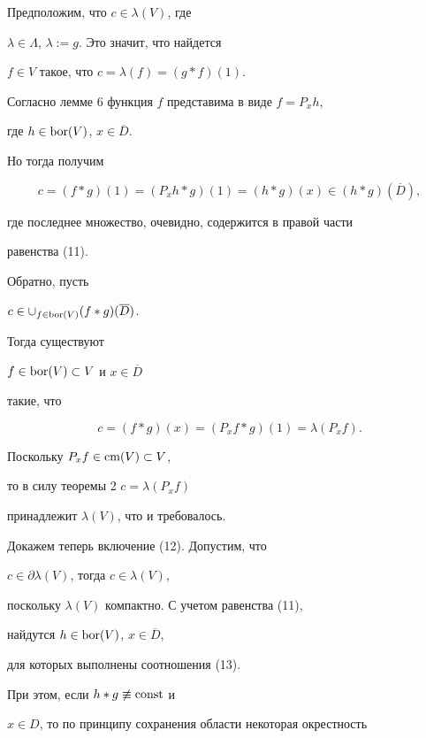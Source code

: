 \begin{pf}


Предположим, что $c \in \lambda(V)$, где


$\lambda \in \Lambda$, $\lambda:=g$. Это значит, что найдется 


$f\in V$ такое, что $c=\lambda(f)= (g*f)(1)$. 


Согласно лемме 6 функция $f$ представима в виде $f=P_x h$, 


где $h\in \operatorname{bor}(V)$, $x \in \overline{D}$. 


Но тогда получим


\begin{equation}


c= (f*g)(1)= (P_x h*g)(1)= (h*g)(x)\in (h*g)(\overline{D}), 


\end{equation}


где последнее множество, очевидно, содержится в правой части


равенства (11).





Обратно, пусть 


$c \in \cup_{f \in \operatorname{bor}(V)} (f*g)(\overline{D})$. 


Тогда существуют 


$f\in \operatorname{bor} (V) \subset V$ и $x \in \overline{D}$ 


такие, что


$$


c= (f*g)(x)= (P_x f*g)(1)= \lambda(P_x f).


$$


Поскольку $P_x f \in \operatorname{cm} (V) \subset V$, 


то в силу теоремы 2\; $c= \lambda(P_x f)$ 


принадлежит $\lambda(V)$, что и требовалось.





Докажем теперь включение (12). Допустим, что 


$c \in \partial\lambda(V)$, тогда $c\in \lambda(V)$, 


поскольку $\lambda(V)$ компактно. С учетом равенства (11),


найдутся $h \in \operatorname{bor} (V)$, $x \in \overline{D}$, 


для которых выполнены соотношения (13).


При этом, если $h*g \not\equiv \operatorname{const}$ и 


$x \in D$, то по принципу сохранения области некоторая окрестность 



\end{pf}
